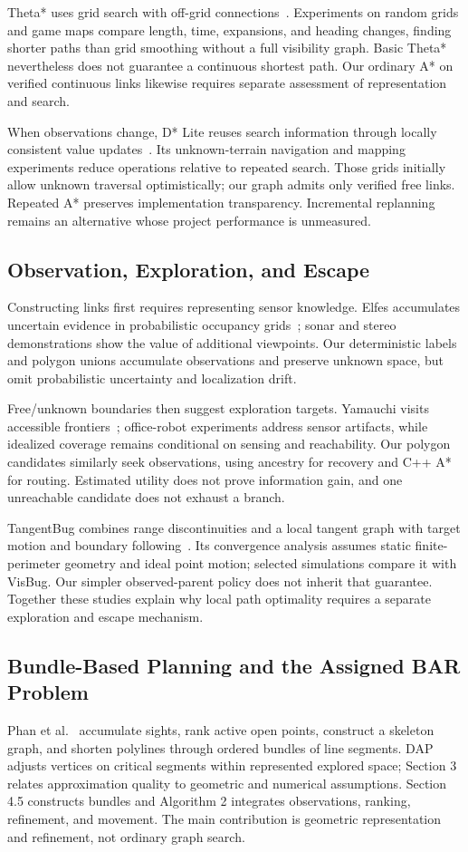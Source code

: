 Theta* uses grid search with off-grid connections~\cite{daniel2010}. Experiments on random grids and game maps compare length, time, expansions, and heading changes, finding shorter paths than grid smoothing without a full visibility graph. Basic Theta* nevertheless does not guarantee a continuous shortest path. Our ordinary A* on verified continuous links likewise requires separate assessment of representation and search.

When observations change, D* Lite reuses search information through locally consistent value updates~\cite{koenig2002}. Its unknown-terrain navigation and mapping experiments reduce operations relative to repeated search. Those grids initially allow unknown traversal optimistically; our graph admits only verified free links. Repeated A* preserves implementation transparency. Incremental replanning remains an alternative whose project performance is unmeasured.

\subsection{Observation, Exploration, and Escape}
Constructing links first requires representing sensor knowledge. Elfes accumulates uncertain evidence in probabilistic occupancy grids~\cite{elfes1989}; sonar and stereo demonstrations show the value of additional viewpoints. Our deterministic labels and polygon unions accumulate observations and preserve unknown space, but omit probabilistic uncertainty and localization drift.

Free/unknown boundaries then suggest exploration targets. Yamauchi visits accessible frontiers~\cite{yamauchi1997}; office-robot experiments address sensor artifacts, while idealized coverage remains conditional on sensing and reachability. Our polygon candidates similarly seek observations, using ancestry for recovery and C++ A* for routing. Estimated utility does not prove information gain, and one unreachable candidate does not exhaust a branch.

TangentBug combines range discontinuities and a local tangent graph with target motion and boundary following~\cite{kamon1996}. Its convergence analysis assumes static finite-perimeter geometry and ideal point motion; selected simulations compare it with VisBug. Our simpler observed-parent policy does not inherit that guarantee. Together these studies explain why local path optimality requires a separate exploration and escape mechanism.

\subsection{Bundle-Based Planning and the Assigned BAR Problem}
Phan et al.~\cite{phan2026} accumulate sights, rank active open points, construct a skeleton graph, and shorten polylines through ordered bundles of line segments. DAP adjusts vertices on critical segments within represented explored space; Section 3 relates approximation quality to geometric and numerical assumptions. Section 4.5 constructs bundles and Algorithm 2 integrates observations, ranking, refinement, and movement. The main contribution is geometric representation and refinement, not ordinary graph search.

